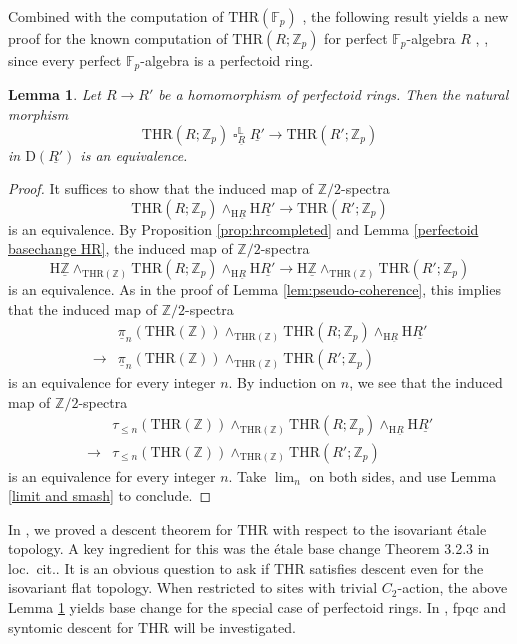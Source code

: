 \documentclass[10pt]{amsart}
\newtheorem{lem}[thm]{Lemma}
\theoremstyle{definition}
\numberwithin{equation}{section}
\newcommand{\F}{\mathbb{F}}
\renewcommand{\L}{\mathbb{L}}
\newcommand{\Z}{\mathbb{Z}}
\newcommand{\rD}{\mathrm{D}}
\newcommand{\rH}{\mathrm{H}}
\newcommand{\ul}{\underline}
\DeclareMathOperator{\sotimes}{\square}
\newcommand{\THR}{\mathrm{THR}}
\begin{document}
Combined with the computation of $\THR(\F_p)$ \cite[Theorem 5.15]{DMPR21},
the following result yields a new proof for the known computation  of $\THR(R;\Z_p)$ for perfect $\F_p$-algebra $R$ \cite[Remark 5.15]{DMP}, \cite[Proposition 6.26]{QS22}, since every perfect $\F_p$-algebra is a perfectoid ring.

\begin{lem}
\label{lem:perfectoid basechange}
Let $R\to R'$ be a homomorphism of perfectoid rings.
Then the natural morphism
\[
\THR(R;\Z_p)
\sotimes_{\ul{R}}^\L
\ul{R'}
\to
\THR(R';\Z_p)
\]
in $\rD(\ul{R'})$ is an equivalence.
\end{lem}
\begin{proof}
It suffices to show 
that the induced map of $\Z/2$-spectra
\[
\THR(R;\Z_p)
\wedge_{\rH \ul{R}}
\rH \ul{R'}
\to
\THR(R';\Z_p)
\]
is an equivalence.
By Proposition \ref{prop:hrcompleted} and Lemma \ref{perfectoid basechange HR},
the induced map of $\Z/2$-spectra
\[
\rH \ul{\Z}
\wedge_{\THR(\Z)}
\THR(R;\Z_p)
\wedge_{\rH \ul{R}}
\rH \ul{R'}
\to
\rH \ul{\Z}
\wedge_{\THR(\Z)}
\THR(R';\Z_p)
\]
is an equivalence.
As in the proof of Lemma \ref{lem:pseudo-coherence},
this implies that the induced map of $\Z/2$-spectra
\begin{align*}
&
\ul{\pi}_n(\THR(\Z))
\wedge_{\THR(\Z)}
\THR(R;\Z_p)
\wedge_{\rH \ul{R}}
\rH \ul{R'}
\\
\to
&
\ul{\pi}_n(\THR(\Z))
\wedge_{\THR(\Z)}
\THR(R';\Z_p)
\end{align*}
is an equivalence for every integer $n$.
By induction on $n$,
we see that the induced map of $\Z/2$-spectra
\begin{align*}
&
\tau_{\leq n}(\THR(\Z))
\wedge_{\THR(\Z)}
\THR(R;\Z_p)
\wedge_{\rH \ul{R}}
\rH \ul{R'}
\\
\to
&
\tau_{\leq n}(\THR(\Z))
\wedge_{\THR(\Z)}
\THR(R';\Z_p)
\end{align*}
is an equivalence for every integer $n$.
Take $\lim_n$ on both sides,
and use Lemma \ref{limit and smash} to conclude.
\end{proof}

In \cite[Theorem 3.4.3]{HP23}, we proved a descent theorem for $\THR$ with respect to the isovariant \'etale topology. A key ingredient for this was the \'etale base change Theorem 3.2.3 in loc.\ cit.. It is an obvious question to ask if $\THR$ satisfies descent even for the isovariant flat topology. When restricted to sites with trivial $C_2$-action, the above Lemma \ref{lem:perfectoid basechange} yields base change for the special case of perfectoid rings.
In \cite{Par23},
fpqc and syntomic descent for $\THR$ will be investigated.
\end{document}
